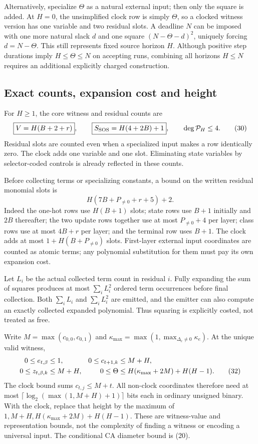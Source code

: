 \documentclass[11pt,a4paper]{article}
\numberwithin{equation}{section}
\begin{document}
Alternatively, specialize $\Theta$ as a natural external input; then only
the square is added. At $H=0$, the unsimplified clock row is simply $\Theta$,
so a clocked witness version has one variable and two residual slots. A deadline
$N$ can be imposed with one more natural slack $d$ and one square
$(N-\Theta-d)^2$, uniquely forcing $d=N-\Theta$. This still represents fixed
source horizon $H$. Although positive step durations imply $H\le\Theta\le N$
on accepting runs, combining all horizons $H\le N$ requires an additional
explicitly charged construction.

\subsection{Exact counts, expansion cost and height}
For $H\ge1$, the core witness and residual counts are
\[
 \boxed{V=H(B+2+r)},\qquad
 \boxed{S_{\rm SOS}=H(4+2B)+1},\qquad \deg\mathcal P_H\le4.          \tag{30}
\]
Residual slots are counted even when a specialized input makes a row
identically zero. The clock adds one variable and one slot. Eliminating state
variables by selector-coded controls is already reflected in these counts.

Before collecting terms or specializing constants, a bound on the written
residual monomial slots is
\[
                 H(7B+P_{\ne0}+r+5)+2.                            \tag{31}
\]
Indeed the one-hot rows use $H(B+1)$ slots; state rows use $B+1$ initially
and $2B$ thereafter; the two update rows together use at most $P_{\ne0}+4$
per layer; class rows use at most $4B+r$ per layer; and the terminal row uses
$B+1$. The clock adds at most $1+H(B+P_{\ne0})$ slots. First-layer external
input coordinates are counted as atomic terms; any polynomial substitution
for them must pay its own expansion cost.

Let $L_i$ be the actual collected term count in residual $i$. Fully expanding
the sum of squares produces at most $\sum_iL_i^2$ ordered term occurrences
before final collection. Both $\sum_iL_i$ and $\sum_iL_i^2$ are emitted, and
the emitter can also compute an exactly collected expanded polynomial. Thus
squaring is explicitly costed, not treated as free.

Write $M=\max(c_{0,0},c_{0,1})$ and
$\kappa_{\max}=\max(1,\max_{\Delta_e\ne0}\kappa_e)$. At the unique valid
witness,
\begin{align}
 0\le e_{t,\beta}&\le1,& 0\le c_{t+1,k}&\le M+H,\notag\\
 0\le z_{t,\beta,k}&\le M+H,&
 0\le\Theta&\le H(\kappa_{\max}+2M)+H(H-1).             \tag{32}
\end{align}
The clock bound sums $c_{t,j}\le M+t$. All non-clock coordinates therefore
need at most $\lceil\log_2(\max(1,M+H)+1)\rceil$ bits each in ordinary
unsigned binary. With the clock, replace that height by the maximum of
$1,M+H,H(\kappa_{\max}+2M)+H(H-1)$. These are witness-value and representation
bounds, not the complexity of finding a witness or encoding a universal input.
The conditional CA diameter bound is (20).
\end{document}
